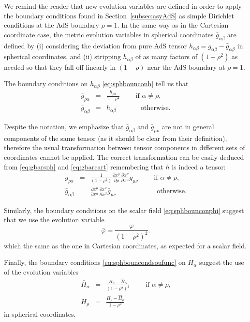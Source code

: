 \documentclass[a4paper,11pt]{article}
\numberwithin{equation}{section}
\begin{document}
We remind the reader that new evolution variables are defined in order to apply the boundary conditions found in Section~\ref{subsec:asyAdS} as simple Dirichlet conditions at the AdS boundary $\rho=1$. In the same way as in the Cartesian coordinate case, the metric evolution variables in spherical coordinates $\bar{g}_{\alpha\beta}$ are defined by (i) considering the deviation from pure AdS tensor $h_{\alpha\beta}=g_{\alpha\beta}-\hat{g}_{\alpha\beta}$ in spherical coordinates, and (ii) stripping $h_{\alpha\beta}$ of as many factors of $(1-\rho^2)$ as needed so that they fall off linearly in $(1-\rho)$ near the AdS boundary at $\rho=1$.

The boundary conditions on $h_{\alpha\beta}$ \eqref{eq:sphbounconh} tell us that
\begin{eqnarray}\label{eq:gbarsph}
\bar{g}_{\rho\alpha}&=&\frac{h_{\rho\alpha} }{1-\rho^2}\qquad \textrm{ if $\alpha\neq\rho$}, \\ \nonumber
\bar{g}_{\alpha\beta}&=&h_{\alpha\beta}  \qquad\;\;\;\;\, \textrm{ otherwise}.
\end{eqnarray}

Despite the notation, we emphasize that $\bar{g}_{\alpha\beta}$ and $\bar{g}_{\mu\nu}$ are not in general components of the same tensor (as it should be clear from their definition), therefore the usual transformation between tensor components in different sets of coordinates cannot be applied. The correct transformation can be easily deduced from \eqref{eq:gbarsph} and \eqref{eq:gbarcart} remembering that $h$ is indeed a tensor: 
\begin{eqnarray}\label{eq:cartosph}
\bar{g}_{\rho\alpha}&=&\frac{1}{(1-\rho^2)}\frac{\partial x^\mu}{\partial \rho}\frac{\partial x^\nu}{\partial x^\alpha}\bar{g}_{\mu\nu}\qquad \textrm{ if $\alpha\neq\rho$}, \\ \nonumber
\bar{g}_{\alpha\beta}&=&\frac{\partial x^\mu}{\partial x^\alpha}\frac{\partial x^\nu}{\partial x^\beta}\bar{g}_{\mu\nu}\qquad\qquad \;\;\;\;\;\; \textrm{ otherwise}.
\end{eqnarray}

Similarly, the boundary conditions on the scalar field \eqref{eq:sphbounconphi} suggest that we use the evolution variable
\begin{equation}
\bar{\varphi}=\frac{\varphi }{(1-\rho^2)^2}.
\end{equation}
which the same as the one in Cartesian coordinates, as expected for a scalar field.

Finally, the boundary conditions \eqref{eq:sphbouncondsoufunc} on $H_\alpha$ suggest the use of the evolution variables
\begin{eqnarray}
 \bar{H}_\alpha&=&\frac{H_\alpha-\hat{H}_\alpha}{(1-\rho^2)^2 } \qquad \textrm{ if $\alpha\neq\rho$,} \\ \nonumber
  \bar{H}_\rho&=&\frac{H_\rho-\hat{H}_\rho}{1-\rho^2 }
 \end{eqnarray}
in spherical coordinates.
\end{document}

